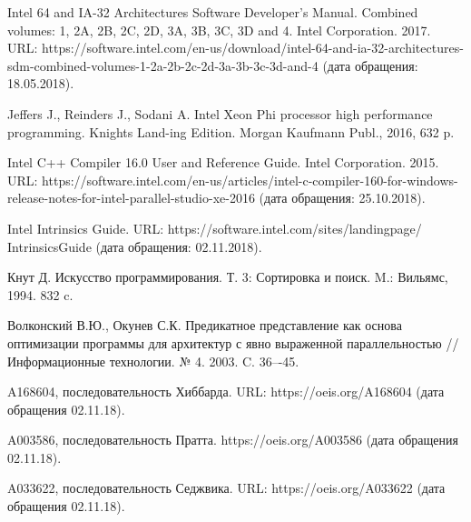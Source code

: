 \documentclass[utf8]{psta}
\begin{document}
\begin{thebibliography}{30}

\by
Intel 64 and IA-32 Architectures Software Developer's Manual. Combined volumes: 1, 2A, 2B, 2C, 2D, 3A, 3B, 3C, 3D and 4. Intel Corporation. 2017. URL: https://software.intel.com/en-us/download/intel-64-and-ia-32-architectures-sdm-combined-volumes-1-2a-2b-2c-2d-3a-3b-3c-3d-and-4 (дата обращения: 18.05.2018).

\by
Jeffers J., Reinders J., Sodani A. Intel Xeon Phi processor high performance programming. Knights Land-ing Edition. Morgan Kaufmann Publ., 2016, 632 p.

\by
Intel C++ Compiler 16.0 User and Reference Guide. Intel Corporation. 2015. URL: https://software.intel.com/en-us/articles/intel-c-compiler-160-for-windows-release-notes-for-intel-parallel-studio-xe-2016 (дата обращения: 25.10.2018).

\by
Intel Intrinsics Guide. URL: https://software.intel.com/sites/landingpage/
IntrinsicsGuide (дата обращения: 02.11.2018).

\by
Кнут Д. Искусство программирования. Т. 3: Сортировка и поиск. M.: Вильямс, 1994. 832 c.

\by
Волконский В.Ю., Окунев С.К. Предикатное представление как основа оптимизации программы для архитектур с явно выраженной параллельностью // Информационные технологии. № 4. 2003. C. 36–-45.

\by
A168604, последовательность Хиббарда. URL: https://oeis.org/A168604 (дата обращения 02.11.18).

\by
A003586, последовательность Пратта. https://oeis.org/A003586 (дата обращения 02.11.18).

\by
A033622, последовательность Седжвика. URL: https://oeis.org/A033622 (дата обращения 02.11.18).

\end{thebibliography}
\end{document}
